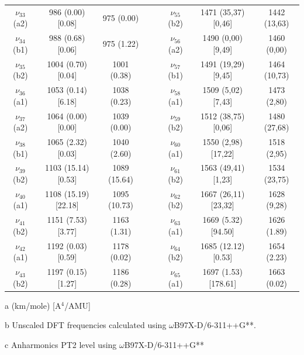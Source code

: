 \begin{table}[H]
\begin{center}
\begin{threeparttable}
{\begin{tabular}{c c c c c c c c}
	$\nu_{33}$ (a2) & 986 (0.00) [0.08] & 975 (0.00) &  & &$\nu_{55}$ (b2) & 1471 (35,37) [0,46] & 1442 (13,63)\\ 
	$\nu_{34}$ (b1)	& 988 (0.68) [0.06] & 975 (1.22)& & & $\nu_{56}$ (a2) & 1490 (0,00) [9,49] & 1460 (0,00) \\ 
	$\nu_{35}$ (b2) & 1004 (0.70) [0.04] & 1001 (0.38)&  & & $\nu_{57}$ (b1)& 1491 (19,29) [9,45] & 1464 (10,73) \\ 
	$\nu_{36}$ (a1) & 1053 (0.14) [6.18] & 1038 (0.23)&  & & $\nu_{58}$ (a1) & 1509 (5,02) [7,43] & 1473 (2,80) \\ 
	$\nu_{37}$ (a2) & 1064 (0.00) [0.00] & 1039 (0.00) & & &$\nu_{59}$ (b2) & 1512 (38,75) [0,06] & 1480 (27,68)\\
	$\nu_{38}$ (b1) & 1065 (2.32) [0.03] & 1040 (2.60) &  & &	$\nu_{60}$ (a1) & 1550 (2,98) [17,22] & 1518 (2,95)\\ 
	$\nu_{39}$ (b2) & 1103 (15.14) [0.53] & 1089 (15.64)&  & &	$\nu_{61}$ (b2) & 1563 (49,41) [1,23] & 1534 (23,75) \\ 
	$\nu_{40}$ (a1) & 1108 (15.19) [22.18] & 1095 (10.73)& &  &$\nu_{62}$ (b2)& 1667 (26,11) [23,32] & 1628 (9,28) \\ 
	$\nu_{41}$ (b2) & 1151 (7.53) [3.77] & 1163 (1.31)&  & & $\nu_{63}$ (a1) & 1669 (5.32) [94.50] & 1626 (1.89)\\ 
	$\nu_{42}$ (a1) & 1192 (0.03) [0.59] & 1178 (0.02)&  & & $\nu_{64}$ (b2) & 1685 (12.12) [0.53] & 1654 (2.23)\\ 
	$\nu_{43}$ (b2) & \multicolumn{1}{c}{1197 (0.15) [1.27]} & 1186 (0.28)& & & $\nu_{65}$ (a1) & 1697 (1.53) [178.61] & 1663 (0.02) \\
	\bottomrule
	\end{tabular}}
	
	\begin{tablenotes}
		\item[a] (km/mole) [A$^{4}$/AMU]
		\item[b] Unscaled DFT frequencies calculated using $\omega$B97X-D/6-311++G**.
		\item[c] Anharmonics PT2 level using $\omega$B97X-D/6-311++G** 
	\end{tablenotes}
\end{threeparttable}
\end{center}
\label{freq-18-dmcarbazole}
\end{table}


	
